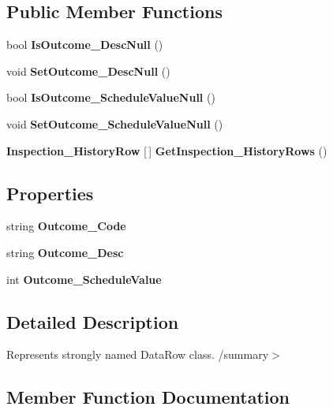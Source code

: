 \subsection*{Public Member Functions}
\begin{DoxyCompactItemize}
\item 
bool \textbf{ Is\+Outcome\+\_\+\+Desc\+Null} ()
\item 
void \textbf{ Set\+Outcome\+\_\+\+Desc\+Null} ()
\item 
bool \textbf{ Is\+Outcome\+\_\+\+Schedule\+Value\+Null} ()
\item 
void \textbf{ Set\+Outcome\+\_\+\+Schedule\+Value\+Null} ()
\item 
\textbf{ Inspection\+\_\+\+History\+Row} [$\,$] \textbf{ Get\+Inspection\+\_\+\+History\+Rows} ()
\end{DoxyCompactItemize}
\subsection*{Properties}
\begin{DoxyCompactItemize}
\item 
string \textbf{ Outcome\+\_\+\+Code}\hspace{0.3cm}{\ttfamily  [get, set]}
\item 
string \textbf{ Outcome\+\_\+\+Desc}\hspace{0.3cm}{\ttfamily  [get, set]}
\item 
int \textbf{ Outcome\+\_\+\+Schedule\+Value}\hspace{0.3cm}{\ttfamily  [get, set]}
\end{DoxyCompactItemize}


\subsection{Detailed Description}
Represents strongly named Data\+Row class. /summary$>$ 

\subsection{Member Function Documentation}
\mbox{\label{class_a_f_h___scheduler_1_1_home_inspection_db_data_set_1_1_inspection___outcomes_row_ac899d5f3122cc666132a4d876b8beb5d}} 
